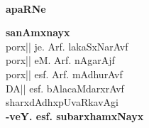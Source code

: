 
~
\medskip

\vfill

\thispagestyle{empty}

\begin{center}
{\Large\bfseries apaRNe}
\end{center}
\bigskip

\begin{center}
{\bf sanAmxnayx}\\
porx|| je. Arf. lakaSxNarAvf\\[4pt]
porx|| eM. Arf. nAgarAjf\\[4pt]
porx|| esf. Arf. mAdhurAvf\\[4pt]
DA|| esf. bAlacaMdarxrAvf\\[0.6cm]
sharxdAdhxpUvaRkavAgi\\
\hfill{\bf -veY. esf. subarxhamxNayx}                                                   
\end{center}

\vfill
\eject
